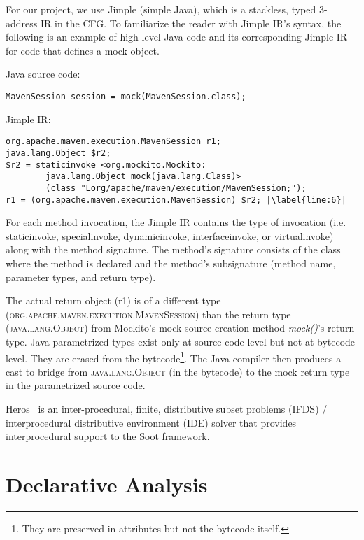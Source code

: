 For our project, we use Jimple (simple Java), which is a stackless, typed 3-address IR in the CFG. To familiarize the reader with Jimple IR's syntax, the following is an example of high-level Java code and its corresponding Jimple IR for code that defines a mock object.

Java source code:
\begin{lstlisting}[basicstyle=\linespread{1.0}\ttfamily\small]
MavenSession session = mock(MavenSession.class);
\end{lstlisting}

Jimple IR:
\begin{lstlisting}[basicstyle=\linespread{1.0}\ttfamily\small,escapechar=|]
org.apache.maven.execution.MavenSession r1;
java.lang.Object $r2;
$r2 = staticinvoke <org.mockito.Mockito:
		java.lang.Object mock(java.lang.Class)>
		(class "Lorg/apache/maven/execution/MavenSession;");
r1 = (org.apache.maven.execution.MavenSession) $r2; |\label{line:6}|
\end{lstlisting}

For each method invocation, the Jimple IR contains the type of invocation (i.e. staticinvoke, specialinvoke, dynamicinvoke, interfaceinvoke, or virtualinvoke) along with the method signature. The method's signature consists of the class where the method is declared and the method's subsignature (method name, parameter types, and return type).

The actual return object (r1) is of a different type \\ (\textsc{org.apache.maven.execution.MavenSession}) than the return type \\ (\textsc{java.lang.Object}) from Mockito's mock source creation method \textit{mock()}'s return type. Java parametrized types exist only at source code level but not at bytecode level. They are erased from the bytecode\footnote{They are preserved in attributes but not the bytecode itself.}.
The Java compiler then produces a cast to bridge from \textsc{java.lang.Object} (in the bytecode) to the mock return type in the parametrized source code.

Heros~\cite{bodden12:_inter_proced_data_flow_analy} is an inter-procedural, finite, distributive subset problems (IFDS) / interprocedural distributive environment (IDE) solver that provides interprocedural support to the Soot framework.

\section{Declarative Analysis}

